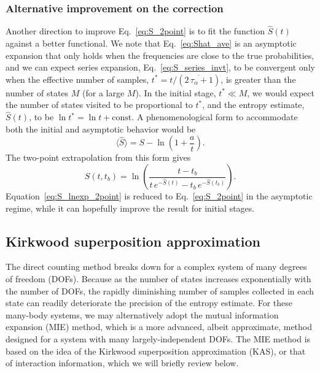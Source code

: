 \documentclass[reprint, superscriptaddress]{revtex4-1}
\begin{document}
\subsubsection{Alternative improvement on the correction}

Another direction to improve Eq.~\eqref{eq:S_2point}
is to fit the function $\hat S(t)$ against a better functional.
%
We note that Eq.~\eqref{eq:Shat_ave} is an asymptotic expansion
that only holds when the frequencies are close to the true probabilities,
and we can expect series expansion, Eq.~\eqref{eq:S_series_invt},
to be convergent only when the effective number of samples,
$t^* = t/(\overline{2 \, \tau_\alpha + 1})$, is greater than
the number of states $M$ (for a large $M$).
%
In the initial stage, $t^* \ll M$,
we would expect the number of states visited to be proportional to $t^*$,
and the entropy estimate, $\hat S(t)$,
to be $\ln t^* = \ln t + \mathrm{const.}$
%
A phenomenological form to accommodate both the initial and asymptotic behavior
would be
$$
  \bigl\langle \hat S \bigr\rangle
  = S - \ln\left(1 + \frac{a}{t}\right).
$$
The two-point extrapolation from this form gives
%
\begin{equation}
  \hat S(t, t_b) = \ln\left(
    \frac{ t - t_b }
         { t \, e^{-\hat S(t)} - t_b \, e^{-\hat S(t_b)} }
  \right)
  .
  \label{eq:S_lnexp_2point}
\end{equation}
%
Equation~\eqref{eq:S_lnexp_2point} is reduced to
Eq.~\eqref{eq:S_2point} in the asymptotic regime,
while it can hopefully improve the result for initial stages.



\subsection{Kirkwood superposition approximation}


The direct counting method breaks down
for a complex system of many degrees of freedom (DOFs).
%
Because as the number of states increases exponentially with the number of DOFs,
the rapidly diminishing number of samples collected in each state
can readily deteriorate the precision of the entropy estimate.
%
For these many-body systems,
we may alternatively adopt
the mutual information expansion (MIE) method,
which is a more advanced, albeit approximate, method designed for a system
with many largely-independent DOFs.
%
The MIE method is based on the idea of
the Kirkwood superposition approximation (KAS)\cite{kirkwood1935, born1946},
or that of interaction information\cite{mcgill1954},
which we will briefly review below.
\end{document}

